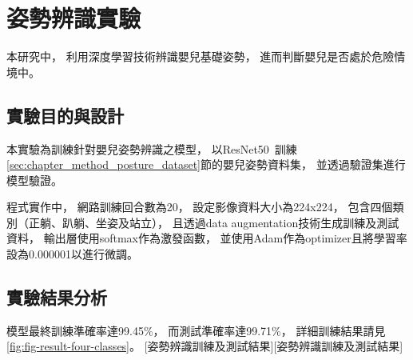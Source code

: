 \documentclass[class=NCU_thesis, crop=false]{standalone}
\begin{document}
\section{姿勢辨識實驗}
本研究中，
利用深度學習技術辨識嬰兒基礎姿勢，
進而判斷嬰兒是否處於危險情境中。

\subsection{實驗目的與設計}
本實驗為訓練針對嬰兒姿勢辨識之模型，
以ResNet50~\cite{he_deep_2016}訓練\ref{sec:chapter_method_posture_dataset}節的嬰兒姿勢資料集，
並透過驗證集進行模型驗證。

程式實作中，
網路訓練回合數為20，
設定影像資料大小為224x224，
包含四個類別（正躺、趴躺、坐姿及站立），
且透過data augmentation技術生成訓練及測試資料，
輸出層使用softmax作為激發函數，
並使用Adam作為optimizer且將學習率設為0.000001以進行微調。

\subsection{實驗結果分析}
模型最終訓練準確率達99.45\%，
而測試準確率達99.71\%，
詳細訓練結果請見\cref{fig:fig-result-four-classes}。
[姿勢辨識訓練及測試結果][姿勢辨識訓練及測試結果]
\end{document}
